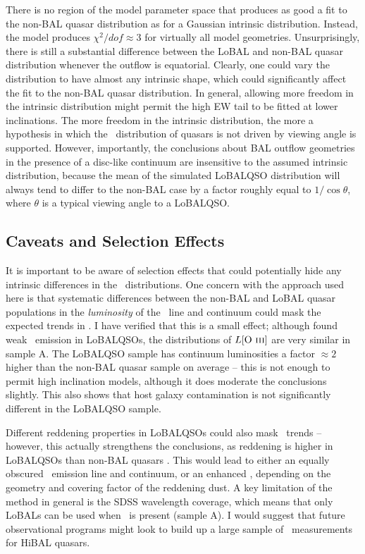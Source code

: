There is no region of the model parameter space that produces as good a fit to
the non-BAL quasar distribution as for a Gaussian intrinsic distribution. Instead, 
the model produces $\chi^2/dof\approx3$ for virtually all model geometries. 
Unsurprisingly, there is still a substantial difference between the LoBAL and 
non-BAL quasar distribution whenever the outflow is equatorial. Clearly, one could vary the 
distribution to have almost any intrinsic shape, which could significantly
affect the fit to the non-BAL quasar distribution. In general, allowing more freedom in the 
intrinsic distribution might permit the high EW tail to be fitted at lower inclinations.
The more freedom in the intrinsic distribution, the more a hypothesis in which 
the \ewo\ distribution of quasars is not driven by viewing angle is supported.
However, importantly, the conclusions about BAL outflow geometries in the presence of
a disc-like continuum are insensitive to the assumed intrinsic distribution, because
the mean of the simulated LoBALQSO distribution will always tend to differ to the non-BAL case
by a factor roughly equal to $1/\cos \theta$, where $\theta$ is a typical viewing angle to a 
LoBALQSO.


\subsection{Caveats and Selection Effects}

It is important to be aware of selection effects that
could potentially hide any intrinsic differences in the \ewo\ distributions. 
One concern with the approach used here is that systematic differences between the
non-BAL and LoBAL quasar populations in the {\em luminosity} of the \oiiifull\ line 
and continuum could mask the expected trends in \ewo. I have verified that this is a 
small effect; although \cite{boroson1992} found weak \oiiifull\ emission in LoBALQSOs,
the distributions of $L[\mathrm{O~\textsc{iii}}]$ are very similar in sample A. 
The LoBALQSO sample has continuum luminosities a factor $\approx2$ higher than the
non-BAL quasar sample on average -- this is not enough to
permit high inclination models, although it does moderate the conclusions slightly.
This also shows that host galaxy contamination is not significantly different in 
the LoBALQSO sample. 

Different reddening properties in LoBALQSOs could also mask
\ewo\ trends -- however, this actually strengthens the conclusions, as
reddening is higher in LoBALQSOs than non-BAL quasars 
\citep[e.g.][see also section~\ref{}]{urrutia2009}.
This would lead to either an equally obscured \oiiifull\ emission line and continuum, 
or an enhanced \ewo, depending on the geometry and covering factor of the reddening
dust. A key limitation of the method in general is the SDSS wavelength coverage,
which means that only LoBALs can be used when \ewo\ is present (sample A).
I would suggest that future observational programs might 
look to build up a large sample of \ewo\ measurements for HiBAL
quasars. 

